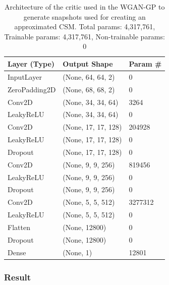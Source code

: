 \documentclass{article}
\begin{document}
\begin{table}[]
    \begin{tabular}{|l|l|l|}
        \hline
        \textbf{Layer (Type)} & \textbf{Output Shape} & \textbf{Param \#} \\ \hline
        InputLayer            & (None, 64, 64, 2)     & 0                 \\ \hline
        ZeroPadding2D         & (None, 68, 68, 2)     & 0                 \\ \hline
        Conv2D                & (None, 34, 34, 64)    & 3264              \\ \hline
        LeakyReLU             & (None, 34, 34, 64)    & 0                 \\ \hline
        Conv2D                & (None, 17, 17, 128)   & 204928            \\ \hline
        LeakyReLU             & (None, 17, 17, 128)   & 0                 \\ \hline
        Dropout               & (None, 17, 17, 128)   & 0                 \\ \hline
        Conv2D                & (None, 9, 9, 256)     & 819456            \\ \hline
        LeakyReLU             & (None, 9, 9, 256)     & 0                 \\ \hline
        Dropout               & (None, 9, 9, 256)     & 0                 \\ \hline
        Conv2D                & (None, 5, 5, 512)     & 3277312           \\ \hline
        LeakyReLU             & (None, 5, 5, 512)     & 0                 \\ \hline
        Flatten               & (None, 12800)         & 0                 \\ \hline
        Dropout               & (None, 12800)         & 0                 \\ \hline
        Dense                 & (None, 1)             & 12801             \\ \hline
        \end{tabular}
    \caption{Architecture of the critic used in the WGAN-GP to generate snapshots used for creating an approximated CSM. Total params: 4,317,761, Trainable params: 4,317,761, Non-trainable params: 0}
    \label{tab:snapshots_critic_WGANGP_architecture}
\end{table}

\subsubsection{Result}
\end{document}
